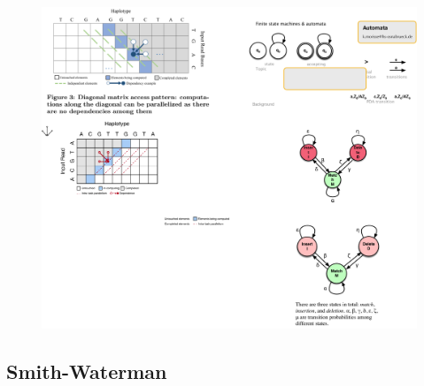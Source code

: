 \begin{figure}[htbp]
\centering
\includegraphics[width=\linewidth]{fig/algo-intra-parallelism.pdf}
\caption{}
\label{fig:para-pair-hmm}
\end{figure}


\subsection{Smith-Waterman}
